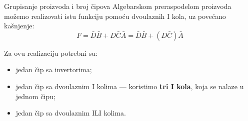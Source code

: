 \begin{frame}[label=02-s047]{Grupisanje proizvoda i broj čipova}
\setlength{\parskip}{0pt}
Algebarskom preraspodelom proizvoda možemo realizovati istu funkciju pomoću dvoulaznih I kola, uz povećano kašnjenje:
\[F=\bar D\bar B+D\bar C\bar A=\bar D\bar B+(D\bar C)\bar A\]
\par\vspace{3mm}
Za ovu realizaciju potrebni su:
\begin{itemize}
\item jedan čip sa invertorima;
\item jedan čip sa dvoulaznim I kolima — koristimo \textbf{tri I kola}, koja se nalaze u jednom čipu;
\item jedan čip sa dvoulaznim ILI kolima.
\end{itemize}
\par\vspace{2mm}
\end{frame}
